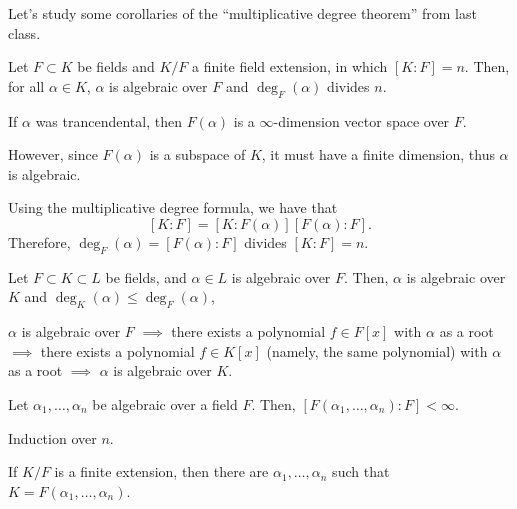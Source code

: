 
Let's study some corollaries of the ``multiplicative degree theorem'' from last class.

\begin{cor}
	Let $F \subset K$ be fields and $K / F$ a finite field extension, in which $[K : F] = n$.
	Then, for all $\alpha \in K$, $\alpha$ is algebraic over $F$ and $\deg_F(\alpha)$ divides $n$.
\end{cor}

\begin{dem}[Algebraic]
	If $\alpha$ was trancendental, then $F(\alpha)$ is a $\infty$-dimension vector space over $F$.
	
	However, since $F(\alpha)$ is a subspace of $K$, it must have a finite dimension, thus $\alpha$ is algebraic.
\end{dem}

\begin{dem}[Division]
	Using the multiplicative degree formula, we have that \[[K:F] = [K:F(\alpha)] [F(\alpha):F].\] Therefore, $\deg_F(\alpha) = [F(\alpha) : F]$ divides  $[K:F] = n$.
\end{dem}

\begin{cor}
	Let $F \subset K \subset L$ be fields, and $\alpha \in L$ is algebraic over $F$. Then, $\alpha$ is algebraic over $K$ and $\deg_K(\alpha) \leq \deg_F(\alpha)$,
\end{cor}

\begin{dem}[Algebraic]
	$\alpha$ is algebraic over $F$  $\implies$ there exists a polynomial $f \in F[x]$ with  $\alpha$ as a root $\implies$ there exists a polynomial $f \in K[x]$ (namely, the same polynomial) with $\alpha$ as a root $\implies$ $\alpha$ is algebraic over $K$.
\end{dem}

\begin{cor}
	Let $\alpha_1, \dots, \alpha_n$ be algebraic over a  field $F$. Then, $[F(\alpha_1, \dots, \alpha_n) : F] < \infty$.
\end{cor}

\begin{sk}
	Induction over $n$.
\end{sk}

\begin{cor}\label{l31:cor4}
	If $K/F$ is a finite extension, then there are $\alpha_1, \dots, \alpha_n$ such that $K = F(\alpha_1, \dots, \alpha_n)$.
\end{cor}

